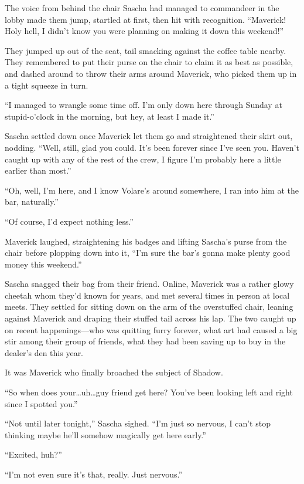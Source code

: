 The voice from behind the chair Sascha had managed to commandeer in the lobby made them jump, startled at first, then hit with recognition. ``Maverick! Holy hell, I didn't know you were planning on making it down this weekend!''

They jumped up out of the seat, tail smacking against the coffee table nearby. They remembered to put their purse on the chair to claim it as best as possible, and dashed around to throw their arms around Maverick, who picked them up in a tight squeeze in turn.

``I managed to wrangle some time off. I'm only down here through Sunday at stupid-o'clock in the morning, but hey, at least I made it.''

Sascha settled down once Maverick let them go and straightened their skirt out, nodding. ``Well, still, glad you could. It's been forever since I've seen you. Haven't caught up with any of the rest of the crew, I figure I'm probably here a little earlier than most.''

``Oh, well, I'm here, and I know Volare's around somewhere, I ran into him at the bar, naturally.''

``Of course, I'd expect nothing less.''

Maverick laughed, straightening his badges and lifting Sascha's purse from the chair before plopping down into it, ``I'm sure the bar's gonna make plenty good money this weekend.''

Sascha snagged their bag from their friend. Online, Maverick was a rather glowy cheetah whom they'd known for years, and met several times in person at local meets. They settled for sitting down on the arm of the overstuffed chair, leaning against Maverick and draping their stuffed tail across his lap. The two caught up on recent happenings---who was quitting furry forever, what art had caused a big stir among their group of friends, what they had been saving up to buy in the dealer's den this year.

It was Maverick who finally broached the subject of Shadow.

``So when does your\ldots{}uh\ldots{}guy friend get here? You've been looking left and right since I spotted you.''

``Not until later tonight,'' Sascha sighed. ``I'm just so nervous, I can't stop thinking maybe he'll somehow magically get here early.''

``Excited, huh?''

``I'm not even sure it's that, really. Just nervous.''

